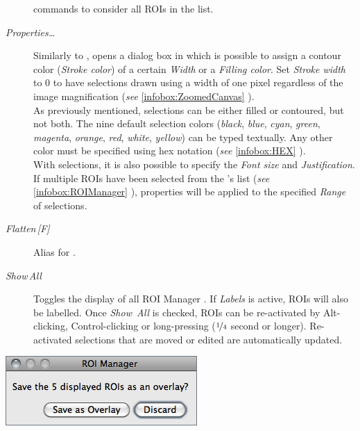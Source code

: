 \begin{description}
commands to consider all ROIs in the list.
\item [{\emph{\label{misc:RM-Properties}Properties\ldots{}}}] Similarly
to ,
opens a dialog box in which is possible to assign a contour color
(\emph{Stroke color}) of a certain \emph{Width} or a \emph{Filling
color}. Set \emph{Stroke width} to 0 to have selections drawn using
a width of one pixel regardless of the image magnification (\emph{see}
\ref{infobox:ZoomedCanvas} ).\\
As previously mentioned, selections can be either filled or contoured,
but not both. The nine default selection colors (\emph{black}, \emph{blue},
\emph{cyan}, \emph{green}, \emph{magenta}, \emph{orange}, \emph{red},
\emph{white}, \emph{yellow}) can be typed textually. Any other color
must be specified using hex notation (\emph{see} \ref{infobox:HEX}
).\\
With  selections, it is also possible to specify
the \emph{Font size} and \emph{Justification}.\\
If multiple ROIs have been selected from the 's
list (\emph{see} \ref{infobox:ROIManager} ),
properties will be applied to the specified \emph{Range} of selections. 
\item [{\emph{Flatten\,{[}F{]}}}] Alias for .
\item [{\emph{\label{misc:RM-ShowAll}Show\,All}}] \improvement{}Toggles
the display of all ROI
Manager . If \emph{Labels} is active,
ROIs will also be labelled. Once \emph{Show~All} is checked, ROIs
can be re-activated by Alt-clicking, Control-clicking or long-pressing
($\nicefrac{1}{4}$ second or longer). Re-activated selections that
are moved or edited are automatically updated. 
\end{description}
\begin{minipage}[c][1\totalheight][t]{0.366\columnwidth}%
\begin{description}
\item [{\includegraphics[scale=0.5]{images/ROIManagerClosing}}]~\end{description}
%
\end{minipage}\feature{}%
